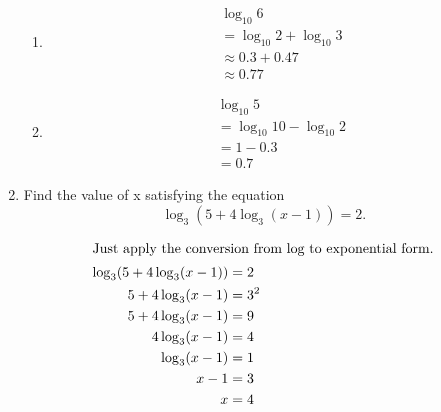 \begin{enumerate}
\begin{solution}
\begin{multicols}{2}
\begin{enumerate}
                \item
                    \begin{align*}
                        &\log_{10} 6\\
                        &=\log_{10} 2 + \log_{10} 3\\
                        &\approx 0.3 + 0.47\\
                        &\approx 0.77
                    \end{align*}

                \item
                    \begin{align*}
                        &\log_{10} 5\\
                        &= \log_{10} 10 - \log_{10} 2\\
                        &= 1 - 0.3\\
                        &= 0.7
                    \end{align*}
            \end{enumerate}
            \end{multicols}
        \end{solution}
    \item Find the value of x satisfying the equation \[ \log_3(5+4\log_3(x-1))=2.\]
        \begin{solution}
            \begin{align*}
                \intertext{Just apply the conversion from log to exponential form.}
                \log_3(5+4\log_3(x-1)) &= 2\\
                5+4\log_3(x-1) &= 3^2\\
                5+4\log_3(x-1) &= 9\\
                4\log_3(x-1) &= 4\\
                \log_3(x-1) &= 1\\
                x-1 &= 3\\
                x &= 4
            \end{align*}
        \end{solution}


\end{enumerate}
